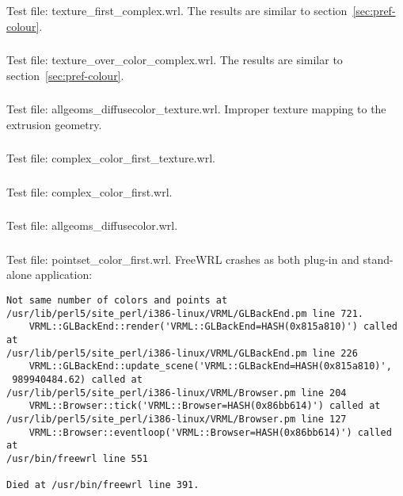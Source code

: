 \subsubsection{\MatHa\MatHb}
Test file: texture\_first\_complex.wrl.\newline
The results are similar to section~\ref{sec:pref-colour}.

\subsubsection{\MatIa\MatIb}
Test file: texture\_over\_color\_complex.wrl.\newline
The results are similar to section~\ref{sec:pref-colour}.

\subsubsection{\MatJa\MatJb}
Test file: allgeoms\_diffusecolor\_texture.wrl.\newline
Improper texture mapping to the extrusion geometry.

\subsubsection{\MatKa\MatKb}
Test file: complex\_color\_first\_texture.wrl.

\subsubsection{\MatL}
Test file: complex\_color\_first.wrl.

\subsubsection{\MatMa\MatMb}
Test file: allgeoms\_diffusecolor.wrl.

\subsubsection{\MatNa\MatNb}
Test file: pointset\_color\_first.wrl.\newline
FreeWRL crashes as both plug-in and stand-alone application:
\begin{verbatim}
Not same number of colors and points at 
/usr/lib/perl5/site_perl/i386-linux/VRML/GLBackEnd.pm line 721.
    VRML::GLBackEnd::render('VRML::GLBackEnd=HASH(0x815a810)') called at 
/usr/lib/perl5/site_perl/i386-linux/VRML/GLBackEnd.pm line 226
    VRML::GLBackEnd::update_scene('VRML::GLBackEnd=HASH(0x815a810)',
 989940484.62) called at
/usr/lib/perl5/site_perl/i386-linux/VRML/Browser.pm line 204
    VRML::Browser::tick('VRML::Browser=HASH(0x86bb614)') called at 
/usr/lib/perl5/site_perl/i386-linux/VRML/Browser.pm line 127
    VRML::Browser::eventloop('VRML::Browser=HASH(0x86bb614)') called at 
/usr/bin/freewrl line 551

Died at /usr/bin/freewrl line 391.
\end{verbatim}

